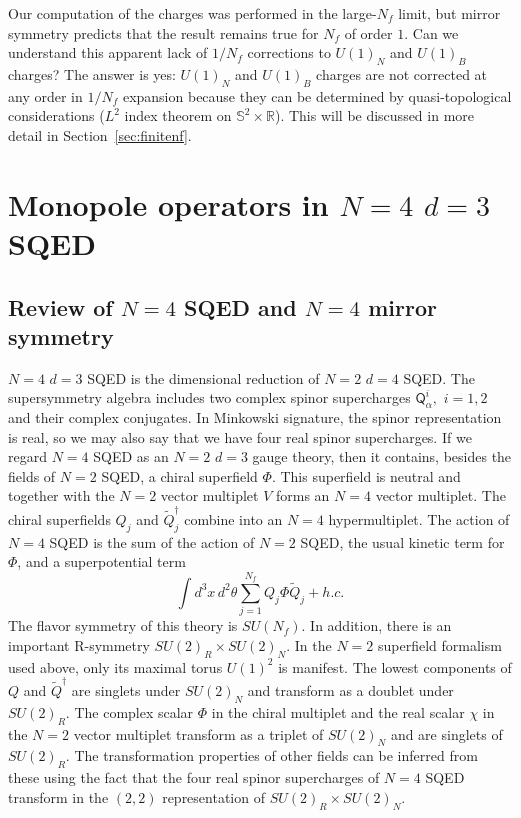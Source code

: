 \documentclass[a4paper,12pt, amsfonts, amssymb]{article}
\newcommand{\RR}{{\mathbb R}}
\renewcommand{\SS}{{\mathbb S}}
\newcommand{\tQ}{{\tilde Q}}
\newcommand{\Q}{{\mathsf Q}}
\begin{document}
Our computation of the charges was performed in the large-$N_f$ limit,
but mirror symmetry predicts that the result remains true for $N_f$ of
order $1$. Can we understand this apparent lack of $1/N_f$ corrections
to $U(1)_N$ and $U(1)_B$ charges?
The answer is yes: $U(1)_N$ and $U(1)_B$ charges are not corrected at any
order in $1/N_f$ expansion
because they can be determined by quasi-topological considerations 
($L^2$ index theorem on $\SS^2\times\RR$).
This will be discussed in more detail in Section~\ref{sec:finitenf}.

\section{Monopole operators in $N=4$ $d=3$ SQED}\label{sec:nfour}

\subsection{Review of $N=4$ SQED and $N=4$ mirror symmetry}

$N=4$ $d=3$ SQED is the dimensional reduction of $N=2$ $d=4$ SQED. The
supersymmetry algebra includes two complex spinor supercharges
$\Q^i_\alpha,$ $i=1,2$ and their complex conjugates. In Minkowski signature,
the spinor representation is real, so we may also say that we have four
real spinor supercharges. 
If we regard $N=4$ SQED as an $N=2$ $d=3$ gauge theory, then it contains, besides the fields of $N=2$ SQED, a chiral superfield $\Phi$. 
This superfield is neutral and together with the $N=2$ vector multiplet $V$ forms an $N=4$ vector multiplet. The chiral superfields $Q_j$ and $\tQ_j^\dag$
combine into an $N=4$ hypermultiplet. The action of $N=4$ SQED is the sum 
of the action of $N=2$ SQED, the usual kinetic term for $\Phi$,
and a superpotential term
$$
\int d^3x\, d^2\theta \sum_{j=1}^{N_f} Q_j\Phi \tQ_j + h.c.
$$ 
The flavor symmetry of this theory is $SU(N_f)$. In addition, there
is an important R-symmetry $SU(2)_R\times SU(2)_N$. In the $N=2$ superfield
formalism used above, only its maximal torus $U(1)^2$ is manifest. 
The lowest components of $Q$ and $\tQ^\dag$ are singlets under $SU(2)_N$
and transform as a doublet under $SU(2)_R$. The complex scalar $\Phi$ in the
chiral multiplet and the real scalar $\chi$ in the $N=2$ vector multiplet transform as a triplet of $SU(2)_N$ and are singlets of $SU(2)_R$. 
The transformation properties of other fields can be inferred from these using the fact that the four real spinor supercharges of $N=4$ SQED transform in the $(2,2)$ representation of $SU(2)_R\times SU(2)_N$. 
\end{document}
